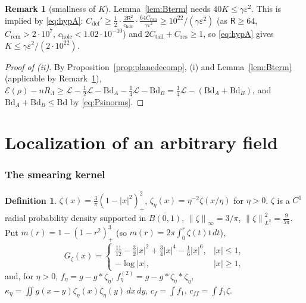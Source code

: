 \documentclass[11pt,reqno]{amsart}
\numberwithin{equation}{section}
\theoremstyle{plain}
\theoremstyle{definition}
\newtheorem{definition}[theorem]{Definition}
\newtheorem{remark}[theorem]{Remark}
\newcommand{\Lam}{\Lambda}
\newcommand{\norm}[1]{\left\|#1\right\|}
\newcommand{\Cc}[1]{C_{\mathrm{#1}}}
\newcommand{\cL}{\mathcal{L}}
\newcommand{\cE}{\mathcal{E}}
\newcommand{\fR}{\mathsf{R}}
\newcommand{\Bd}{\mathrm{Bd}}
\begin{document}
\begin{remark}[smallness of $K$]\label{rem:Ksmall}
Lemma~\ref{lem:Bterm} needs $40K\le\gamma\varepsilon^2$.  This is implied by \eqref{eq:hypA}: $\Cc{def}'\ge\frac12\cdot\frac{2\fR^2}{c_{\mathrm{hole}}}\cdot\frac{64\Cc{rem}}{\gamma\varepsilon^2}\ge10^{22}/(\gamma\varepsilon^2)$ (as $\fR\ge64$, $\Cc{rem}>2\cdot10^7$, $c_{\mathrm{hole}}<1.02\cdot10^{-10}$) and $2\Cc{tail}+\Cc{res}\ge1$, so \eqref{eq:hypA} gives $K\le\gamma\varepsilon^2/(2\cdot10^{22})$.
\end{remark}

\begin{proof}[Proof of (ii)]
By Proposition~\ref{prop:planedecomp}, (i) and Lemma~\ref{lem:Bterm} (applicable by Remark~\ref{rem:Ksmall}), $\cE(\rho)-nR_\Lam\ge\cL-\frac12\cL-\Bd_A-\frac14\cL-\Bd_B=\frac14\cL-(\Bd_A+\Bd_B)$, and $\Bd_A+\Bd_B\le\Bd$ by \eqref{eq:Psinorms}.
\end{proof}

\part{Localization of an arbitrary field}

\section{The smearing kernel}\label{sec:smearing}

\begin{definition}\label{def:zeta}
$\zeta(x)=\frac3\pi(1-|x|^2)_+^2$, $\zeta_\eta(x)=\eta^{-2}\zeta(x/\eta)$ for $\eta>0$.  $\zeta$ is a $C^1$ radial probability density supported in $\overline{B(0,1)}$, $\norm\zeta_\infty=3/\pi$, $\norm\zeta_{L^2}^2=\frac9{5\pi}$.  Put $m(r)=1-(1-r^2)_+^3$ (so $m(r)=2\pi\int_0^{r}\zeta(t)t\,dt$),
\[
G_\zeta(x)=\begin{cases}\frac{11}{12}-\frac32|x|^2+\frac34|x|^4-\frac16|x|^6,&|x|\le1,\\-\log|x|,&|x|\ge1,\end{cases}
\]
and, for $\eta>0$, $f_\eta=g-g*\zeta_\eta$, $f^{(2)}_\eta=g-g*\zeta_\eta*\zeta_\eta$, $\kappa_\eta=\iint g(x-y)\zeta_\eta(x)\zeta_\eta(y)\,dx\,dy$, $c_f=\int f_1$, $c_{ff}=\int f_1\zeta$.
\end{definition}
\end{document}
